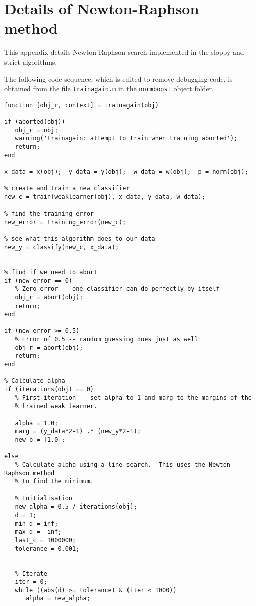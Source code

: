 
\chapter{Details of Newton-Raphson method}
\label{appendix:newton-raphson}

This appendix details Newton-Raphson search implemented in the sloppy
and strict algorithms.

The following code sequence, which is edited to remove debugging code,
is obtained from the file {\tt trainagain.m} in the {\tt normboost}
object folder.

\small
\begin{verbatim}
function [obj_r, context] = trainagain(obj)

if (aborted(obj))
   obj_r = obj;
   warning('trainagain: attempt to train when training aborted');
   return;
end

x_data = x(obj);  y_data = y(obj);  w_data = w(obj);  p = norm(obj);

% create and train a new classifier
new_c = train(weaklearner(obj), x_data, y_data, w_data);

% find the training error
new_error = training_error(new_c);

% see what this algorithm does to our data
new_y = classify(new_c, x_data);


% find if we need to abort
if (new_error == 0)
   % Zero error -- one classifier can do perfectly by itself
   obj_r = abort(obj);
   return;
end

if (new_error >= 0.5)
   % Error of 0.5 -- random guessing does just as well
   obj_r = abort(obj);
   return;
end

% Calculate alpha
if (iterations(obj) == 0)
   % First iteration -- set alpha to 1 and marg to the margins of the
   % trained weak learner.

   alpha = 1.0;
   marg = (y_data*2-1) .* (new_y*2-1);
   new_b = [1.0];

else
   % Calculate alpha using a line search.  This uses the Newton-Raphson method
   % to find the minimum.

   % Initialisation
   new_alpha = 0.5 / iterations(obj);
   d = 1;
   min_d = inf;
   max_d = -inf;
   last_c = 1000000;
   tolerance = 0.001;
   
   
   % Iterate
   iter = 0;
   while ((abs(d) >= tolerance) & (iter < 1000))
      alpha = new_alpha;
      

\end{verbatim}

